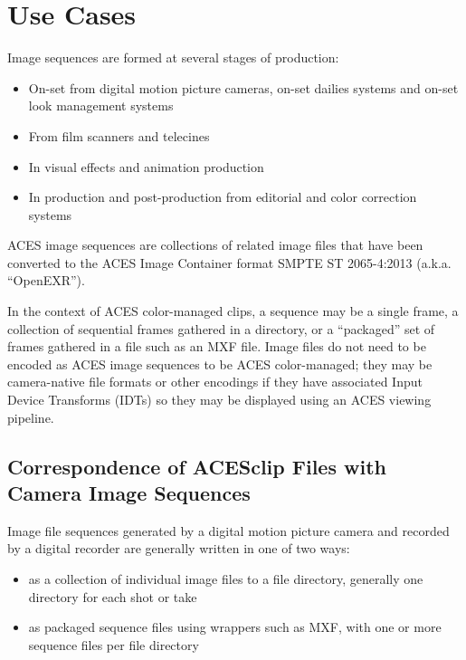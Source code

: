 \regularsectionformat	%
\chapter{Use Cases}

Image sequences are formed at several stages of production:

\begin{itemize}
	\item On-set from digital motion picture cameras, on-set dailies systems and on-set look management systems
	\item From film scanners and telecines
	\item In visual effects and animation production
	\item In production and post-production from editorial and color correction systems	
\end{itemize}

ACES image sequences are collections of related image files that have been converted to the ACES Image Container format SMPTE ST 2065-4:2013  (a.k.a. ``OpenEXR'').

In the context of ACES color-managed clips, a sequence may be a single frame, a collection of sequential frames gathered in a directory, or a ``packaged'' set of frames gathered in a file such as an MXF file. Image files do not need to be encoded as ACES image sequences to be ACES color-managed; they may be camera-native file formats or other encodings if they have associated Input Device Transforms (IDTs) so they may be displayed using an ACES viewing pipeline.

\section{Correspondence of ACESclip Files with Camera Image Sequences}
Image file sequences generated by a digital motion picture camera and recorded by a digital recorder are generally written in one of two ways:

\begin{itemize}
	\item as a collection of individual image files to a file directory, generally one directory for each shot or take
	\item as packaged sequence files using wrappers such as MXF, with one or more sequence files per file directory
\end{itemize}

